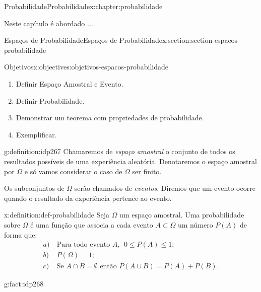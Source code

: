 \documentclass[oneside,10pt,]{book}
\numberwithin{equation}{section}
\newcommand{\amp}{&}
\begin{document}
%
%
\typeout{************************************************}
\typeout{************************************************}
%
\begin{chapterptx}{Probabilidade}{}{Probabilidade}{}{}{x:chapter:probabilidade}
\begin{introduction}{}%
Neste capítulo é abordado ....%
\end{introduction}%
%
%
\typeout{************************************************}
\typeout{************************************************}
%
\begin{sectionptx}{Espaços de Probabilidade}{}{Espaços de Probabilidade}{}{}{x:section:section-espacos-probabilidade}
\begin{objectives}{Objetivos}{x:objectives:objetivos-espacos-probabilidade}
%
\begin{enumerate}
\item{}Definir Espaço Amostral e Evento.%
\item{}Definir Probabilidade.%
\item{}Demonstrar um teorema com propriedades de probabilidade.%
\item{}Exemplificar.%
\end{enumerate}
\end{objectives}
\begin{definition}{}{g:definition:idp267}%
Chamaremos de \emph{espaço amostral} o conjunto de todos os resultados possíveis de uma experiência aleatória. Denotaremos o espaço amostral por \(\Omega\) e só vamos considerar o caso de \(\Omega\) ser finito.%
\par
Os subconjuntos de \(\Omega\) serão chamados de \emph{eventos}. Diremos que um evento ocorre quando o resultado da experiência pertence ao evento.%
\end{definition}
\begin{definition}{}{x:definition:def-probabilidade}%
Seja \(\Omega\) um espaço amostral. Uma probabilidade sobre \(\Omega\) é uma função que associa a cada evento \(A\subset\Omega\) um número \(P(A)\) de forma que:%
\begin{align*}
a) \amp ~ \text{Para todo evento }A ,~~ 0\leq P(A)\leq 1;  \\
b) \amp ~ P(\Omega)=1;  \\
c) \amp ~ \text{Se } A\cap B = \emptyset \text{ então } P(A\cup B) = P(A) + P(B).  
\end{align*}
%
\end{definition}
\begin{fact}{}{}{g:fact:idp268}%

\end{fact}
\end{sectionptx}
\end{chapterptx}
\end{document}
